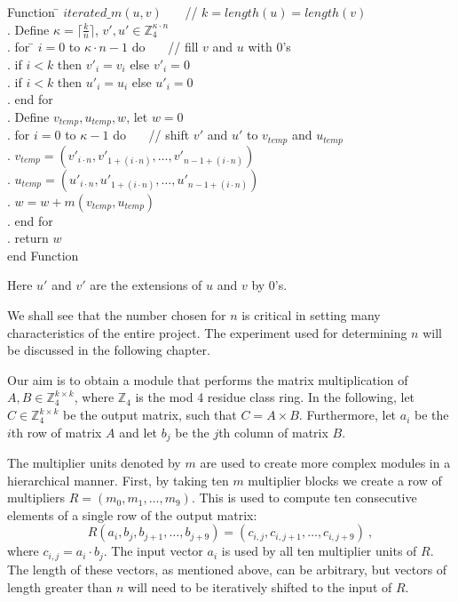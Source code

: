 \documentclass[11pt,twoside]{article}
\begin{document}
\begin{tabbing}
Function \= $iterated\_m(u,v)$ \ \ \ // $k=length(u)=length(v)$\\
. Define $\kappa=\lceil \frac{k}{n} \rceil$, $v',u' \in \mathbb{Z}_{4}^{\kappa \cdot n}$ \\
. for \= $i=0$ to $\kappa \cdot n -1$ do \ \ \ // fill $v$ and $u$ with 0's\\
\> . if $i<k$ then $v'_{i}=v_{i}$ else $v'_{i}=0$ \\
\> . if $i<k$ then $u'_{i}=u_{i}$ else $u'_{i}=0$ \\
. end for \\
. Define $v_{temp},u_{temp},w$, let $w=0$ \\
. for $i=0$ to $\kappa-1$ do \ \ \ // shift $v'$ and $u'$ to $v_{temp}$ and $u_{temp}$\\
\> . $v_{temp}=(v'_{i \cdot n},v'_{1+(i \cdot n)},\ldots,v'_{n-1+(i \cdot n)})$ \\
\> . $u_{temp}=(u'_{i \cdot n},u'_{1+(i \cdot n)},\ldots,u'_{n-1+(i \cdot n)})$ \\
\> . $w=w+m(v_{temp},u_{temp})$ \\
. end for \\
. return $w$ \\
end Function \\
\end{tabbing}

Here $u'$ and $v'$ are the extensions of $u$ and $v$ by 0's.

We shall see that the number chosen for $n$ is critical in setting many characteristics of the entire project. The experiment used for determining $n$ will be discussed in the following chapter.

Our aim is to obtain a module that performs the matrix multiplication of $A,B\in \mathbb{Z}_{4}^{k \times k}$, where $\mathbb{Z}_{4}$ is the mod 4 residue class ring. In the following, let $C\in \mathbb{Z}_{4}^{k \times k}$ be the output matrix, such that $C=A \times B$. Furthermore, let $a_{i}$ be the $i$th row of matrix $A$ and let $b_{j}$ be the $j$th column of matrix $B$.

The multiplier units denoted by $m$ are used to create more complex modules in a hierarchical manner. First, by taking ten $m$ multiplier blocks we create a row of multipliers $R=(m_{0},m_{1},\ldots,m_{9})$. This is used to compute ten consecutive elements of a single row of the output matrix:
\[
R(a_{i},b_{j},b_{j+1},\ldots,b_{j+9})=(c_{i,j},c_{i,j+1},\ldots,c_{i,j+9})\ ,
\]
where $c_{i,j}=a_{i} \cdot b_{j}$. The input vector $a_i$ is used by all ten multiplier units of $R$. The length of these vectors, as mentioned above, can be arbitrary, but vectors of length greater than $n$ will need to be iteratively shifted to the input of $R$.
\end{document}
